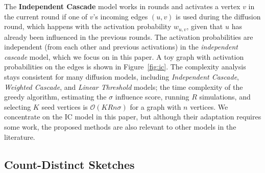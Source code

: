 \documentclass[final,5p,times,twocolumn]{elsarticle}
\newcommand\kktodo[1]{\textcolor{red}{#1}}
\newcommand\ggx[1]{\textcolor{blue}{#1}}
\newcommand\fixme[1]{#1}
\begin{document}
The {\bf Independent Cascade} model \fixme{works in rounds and activates} a vertex $v$ in the current round if one of $v$'s \fixme{incoming edges $(u, v)$ is used during the diffusion} round, \fixme{which happens with the activation probability $w_{u, v}$, given that $u$ has already been} influenced \fixme{in the previous rounds. The activation probabilities are independent (from each other and previous activations)} in the {\em independent cascade} model, which we focus on in this paper. A toy graph with activation probabilities on the edges is shown in Figure~\ref{fig:ic}.
The complexity analysis stays consistent for many diffusion models, including {\em Independent Cascade}, {\em Weighted Cascade}, and {\em Linear Threshold} models; the time complexity of the greedy algorithm, estimating the $\sigma$ influence score, running $R$ simulations, and selecting $K$ seed vertices is $\mathcal{O}(KRn\sigma)$ for a graph with $n$ vertices. 
We concentrate on the IC model in this paper, but although their adaptation requires some work, the proposed methods are also relevant to other models in the literature.

\subsection{Count-Distinct Sketches}\label{sec:sketch}

\end{document}
